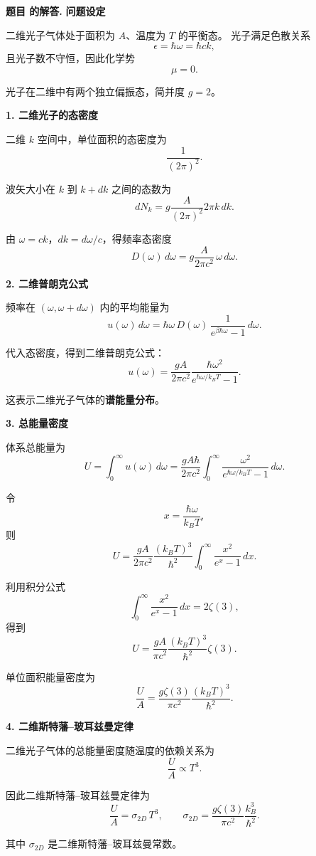 \documentclass[12pt, a4paper, oneside]{ctexart}
\newcounter{problemname}
\newenvironment{solution}
  {\par\noindent\textbf{题目 \theproblemname 的解答. }}
  {\par}
\begin{document}
\begin{solution}
  \textbf{问题设定}

二维光子气体处于面积为 $A$、温度为 $T$ 的平衡态。
光子满足色散关系
\[
\epsilon=\hbar\omega=\hbar c k,
\]
且光子数不守恒，因此化学势
\[
\mu=0.
\]

光子在二维中有两个独立偏振态，简并度 $g=2$。

\textbf{1. 二维光子的态密度}

二维 $k$ 空间中，单位面积的态密度为
\[
\frac{1}{(2\pi)^2}.
\]

波矢大小在 $k$ 到 $k+dk$ 之间的态数为
\[
dN_k = g \frac{A}{(2\pi)^2} 2\pi k\,dk.
\]

由 $\omega=ck$，$dk=d\omega/c$，得频率态密度
\[
D(\omega)\,d\omega
= g\frac{A}{2\pi c^2}\,\omega\,d\omega.
\]

\textbf{2. 二维普朗克公式}

频率在 $(\omega,\omega+d\omega)$ 内的平均能量为
\[
u(\omega)\,d\omega
= \hbar\omega\,D(\omega)\,
\frac{1}{e^{\beta\hbar\omega}-1}\,d\omega.
\]

代入态密度，得到二维普朗克公式：
\[
\boxed{
u(\omega)
= \frac{gA}{2\pi c^2}
\frac{\hbar\omega^2}{e^{\hbar\omega/k_BT}-1}
}.
\]

这表示二维光子气体的\textbf{谱能量分布}。

\textbf{3. 总能量密度}

体系总能量为
\[
U=\int_0^\infty u(\omega)\,d\omega
= \frac{gA\hbar}{2\pi c^2}
\int_0^\infty
\frac{\omega^2}{e^{\hbar\omega/k_BT}-1}\,d\omega.
\]

令
\[
x=\frac{\hbar\omega}{k_BT},
\]
则
\[
U=\frac{gA}{2\pi c^2}
\frac{(k_BT)^3}{\hbar^2}
\int_0^\infty\frac{x^2}{e^x-1}\,dx.
\]

利用积分公式
\[
\int_0^\infty\frac{x^2}{e^x-1}\,dx=2\zeta(3),
\]
得到
\[
U
= \frac{gA}{\pi c^2}
\frac{(k_BT)^3}{\hbar^2}\zeta(3).
\]

单位面积能量密度为
\[
\boxed{
\frac{U}{A}
= \frac{g\zeta(3)}{\pi c^2}
\frac{(k_BT)^3}{\hbar^2}
}.
\]

\textbf{4. 二维斯特藩–玻耳兹曼定律}

二维光子气体的总能量密度随温度的依赖关系为
\[
\frac{U}{A}\propto T^3.
\]

因此二维斯特藩–玻耳兹曼定律为
\[
\boxed{
\frac{U}{A}
= \sigma_{2D}\,T^3,
\qquad
\sigma_{2D}
= \frac{g\zeta(3)}{\pi c^2}
\frac{k_B^3}{\hbar^2}
}.
\]

其中 $\sigma_{2D}$ 是二维斯特藩–玻耳兹曼常数。
\end{solution}
\end{document}
